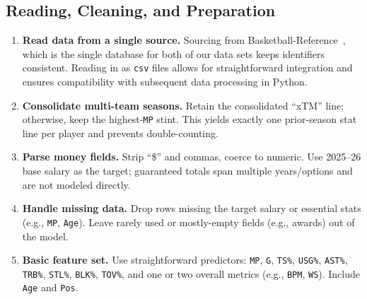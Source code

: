 \documentclass{article}
\theoremstyle{plain}
\theoremstyle{definition}
\theoremstyle{remark}
\begin{document}
\subsection*{Reading, Cleaning, and Preparation}
\begin{enumerate}
    \item  \textbf{Read data from a single source.} Sourcing from Basketball-Reference~\cite{bbref_contracts,bbref_advanced_stats_2025}, which is the single database for both of our data sets keeps identifiers consistent. Reading in as \texttt{csv} files allows for straightforward integration and ensures compatibility with subsequent data processing in Python. 
    \item \textbf{Consolidate multi-team seasons.} Retain the consolidated ``xTM'' line; otherwise, keep the highest-\texttt{MP} stint. This yields exactly one prior-season stat line per player and prevents double-counting.
    \item \textbf{Parse money fields.} Strip ``\$'' and commas, coerce to numeric. Use 2025--26 base salary as the target; guaranteed totals span multiple years/options and are not modeled directly.
    \item \textbf{Handle missing data.} Drop rows missing the target salary or essential stats (e.g., \texttt{MP}, \texttt{Age}). Leave rarely used or mostly-empty fields (e.g., awards) out of the model.
    \item \textbf{Basic feature set.} Use straightforward predictors: \texttt{MP}, \texttt{G}, \texttt{TS\%}, \texttt{USG\%}, \texttt{AST\%}, \texttt{TRB\%}, \texttt{STL\%}, \texttt{BLK\%}, \texttt{TOV\%}, and one or two overall metrics (e.g., \texttt{BPM}, \texttt{WS}). Include \texttt{Age} and \texttt{Pos}. 

\end{enumerate}







\end{document}

